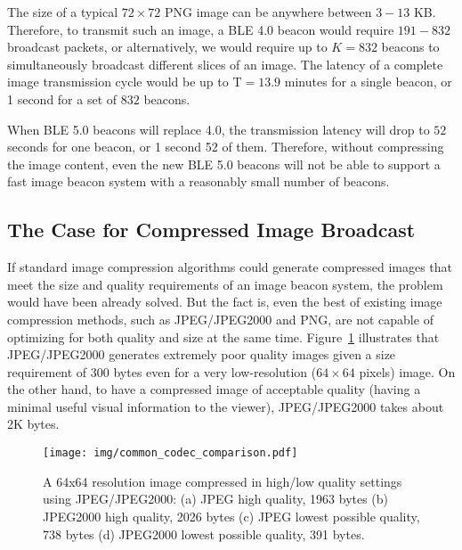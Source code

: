 The size of a typical $72\times 72$ PNG image can be anywhere between $3-13$ KB. Therefore, to transmit such an image, a BLE 4.0 beacon would require $191-832$ broadcast packets, or alternatively, we would require up to $K = 832$ beacons to simultaneously broadcast different slices of an image. The latency of a complete image transmission cycle would be up to $\mathrm{T = 13.9}$ minutes for a single beacon, or 1 second for a set of $832$ beacons.

When BLE 5.0 beacons will replace 4.0, the transmission latency will drop to $52$ seconds for one beacon, or 1 second 52 of them. Therefore, without compressing the image content, even the new BLE 5.0 beacons will not be able to support a fast image beacon system with a reasonably small number of beacons.


\subsection{The Case for Compressed Image Broadcast}

If standard image compression algorithms could generate compressed images that meet the size and quality requirements of an image beacon system, the problem would have been already solved. But the fact is, even the best of existing image compression methods, such as JPEG/JPEG2000 and PNG, are not capable of optimizing for both quality and size at the same time. Figure~\ref{fig:common_codec_comparison} illustrates that JPEG/JPEG2000 generates extremely poor quality images given a size requirement of 300 bytes even for a very low-resolution ($64 \times 64$ pixels) image. On the other hand, to have a compressed image of acceptable quality (having a minimal useful visual information to the viewer), JPEG/JPEG2000 takes about 2K bytes.

\begin{figure}[!htb]
    \begin{center}
	    \texttt{[image: img/common\_codec\_comparison.pdf]}
	    \vspace{-2em}
	    \caption{\footnotesize A 64x64 resolution image compressed in high/low quality settings using JPEG/JPEG2000: (a) JPEG high quality, 1963 bytes (b) JPEG2000 high quality, 2026 bytes (c) JPEG lowest possible quality, 738 bytes (d) JPEG2000 lowest possible quality, 391 bytes.}
	    \label{fig:common_codec_comparison}
    \end{center}
\end{figure}

